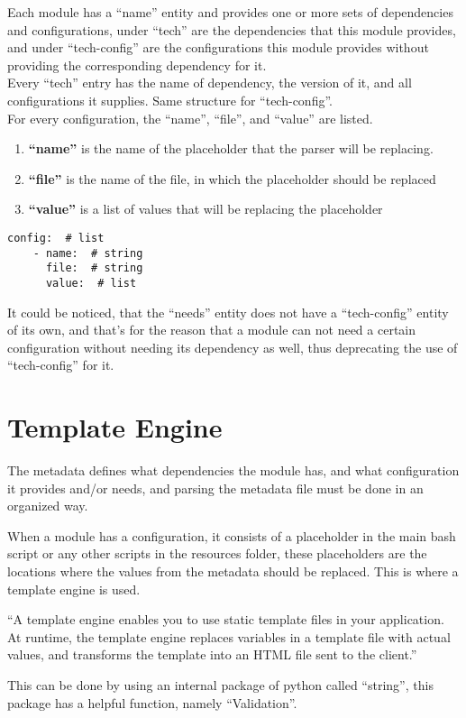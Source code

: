 Each module has a “name” entity and provides one or more sets of dependencies and configurations, under “tech” are the dependencies that this module provides, and under “tech-config” are the configurations this module provides without providing the corresponding dependency for it.\\
Every “tech” entry has the name of dependency, the version of it, and all configurations it supplies. Same structure for “tech-config”.\\
For every configuration, the “name”, “file”, and “value” are listed.\\
\begin{enumerate}
  \item \textbf{“name”} is the name of the placeholder that the parser will be replacing.
  \item \textbf{“file”} is the name of the file, in which the placeholder should be replaced
  \item \textbf{“value”} is a list of values that will be replacing the placeholder
\end{enumerate}

\begin{lstlisting}[caption=YAML Schema, style=pythonstyle]
config:  # list
    - name:  # string
      file:  # string
      value:  # list
\end{lstlisting}
It could be noticed, that the “needs” entity does not have a “tech-config” entity of its own, and that’s for the reason that a module can not need a certain configuration without needing its dependency as well, thus deprecating the use of “tech-config” for it.


\section{Template Engine}
The metadata defines what dependencies the module has, and what configuration it provides and/or needs, and parsing the metadata file must be done in an organized way.

When a module has a configuration, it consists of a placeholder in the main bash script or any other scripts in the resources folder, these placeholders are the locations where the values from the metadata should be replaced. This is where a template engine is used.

“A template engine enables you to use static template files in your application. At runtime, the template engine replaces variables in a template file with actual values, and transforms the template into an HTML file sent to the client.”\cite{template}

This can be done by using an internal package of python called “string”, this package has a helpful function, namely “Validation”\cite{string}.
